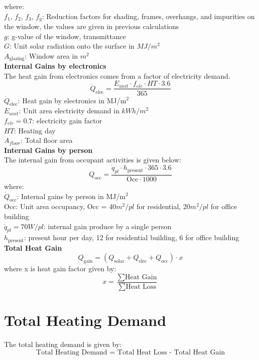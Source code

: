 \documentclass[a4paper, oneside]{discothesis}
\begin{document}
	where:\\
	$f_1$, $f_2$, $f_3$, $f_g$: Reduction factors for shading, frames, overhangs, and impurities on the window, the values are given in previous calculations\\
	$g$: g-value of the window, transmittance\\
	$G$: Unit solar radiation onto the surface in $MJ/m^2$\\
	$A_{\text{glazing}}$: Window area in $m^2$\\

	
	\textbf{Internal Gains by electronics}\\
	The heat gain from electronics comes from a factor of electricity demand.
	\[\dot{Q}_{\text{elec}} = \frac{E_{unit}  \cdot f_{ele} \cdot HT \cdot 3.6}{365} \]
	$\dot{Q}_{\text{elec}}$: Heat gain by electronics in MJ/m$^2$\\
	$E_{unit}$: Unit area electricity demand in $kWh/m^2$\\
	$f_{ele} = 0.7$: electricity gain factor\\
	$HT$: Heating day\\
	$A_{floor}$: Total floor area\\


	\textbf{Internal Gains by person}\\
	The internal gain from occupant activities is given below:\\

	\[Q_{\text{occ}} = \frac{\dot{q}_{pl} \cdot h_{\text{present}} \cdot 365 \cdot 3.6}{\text{Occ} \cdot  1000}\]
	where:\\
	$\dot{Q}_{\text{occ}}$: Internal gains by person in MJ/m$^2$\\
	$\text{Occ}$: Unit area occupancy, Occ = 40$m^2/pl$ for residential, 20$m^2/pl$ for office building\\
	$\dot{q}_{pl} = 70W/pl$: internal gain produce by a single person\\
	$h_{\text{present}}$: present hour per day, 12 for residential building, 6 for office building\\



	\textbf{Total Heat Gain}\\
	\[Q_{\text{gain}} = (Q_{\text{solar}} + Q_{\text{elec}} + Q_{\text{occ}}) \cdot x\]
	where x is heat gain factor given by:
	\[ x = \frac{\sum \text{Heat Gain}}{\sum \text{Heat Loss}}\]
	\newpage
	\section{Total Heating Demand}
	The total heating demand is given by:
	\[\text{Total Heating Demand = Total Heat Loss - Total Heat Gain}\]
\end{document}
